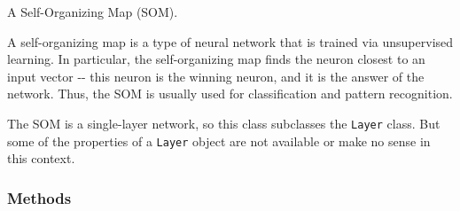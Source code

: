 A Self-Organizing Map (SOM).

A self-organizing map is a type of neural network that is trained via
unsupervised learning. In particular, the self-organizing map finds the
neuron closest to an input vector -{}- this neuron is the winning neuron, and
it is the answer of the network. Thus, the SOM is usually used for
classification and pattern recognition.

The SOM is a single-layer network, so this class subclasses the \texttt{Layer}
class. But some of the properties of a \texttt{Layer} object are not available or
make no sense in this context.


  \subsubsection{Methods}

    \vspace{0.5ex}

